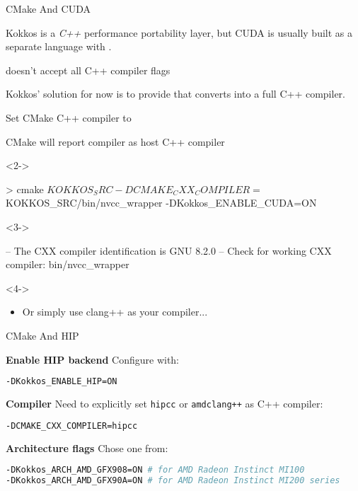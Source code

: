 \begin{frame}[fragile]{CMake And CUDA}
\begin{itemize}
\item Kokkos is a \emph{C++} performance portability layer, but CUDA is usually built as a separate language with .
\item {} doesn't accept all C++ compiler flags
\item Kokkos' solution for now is to provide   that converts  into a full C++ compiler.
 { \item Set CMake C++ compiler to  }
 { \item CMake will report compiler as host C++ compiler }
\end{itemize}

\begin{uncoverenv}<2->
\begin{shell}[linebackground={%
    \btLstHL<2>{2}{orange!30}%
}]
> cmake ${KOKKOS_SRC}
  -DCMAKE_CXX_COMPILER=${KOKKOS_SRC}/bin/nvcc_wrapper
  -DKokkos_ENABLE_CUDA=ON
\end{shell}
\end{uncoverenv}

\begin{uncoverenv}<3->
\begin{shell}[linebackground={
   \btLstHL<3>{1}{green!30}%
   \btLstHL<4>{2}{orange!30}
}]
-- The CXX compiler identification is GNU 8.2.0
-- Check for working CXX compiler: bin/nvcc_wrapper
\end{shell}
\end{uncoverenv}

\begin{uncoverenv}<4->
\begin{itemize}
  \item Or simply use clang++ as your compiler...
\end{itemize}
\end{uncoverenv}

\end{frame}

\begin{frame}[fragile]{CMake And HIP}

\textbf{Enable HIP backend}
Configure with:
\begin{lstlisting}[language=bash]
-DKokkos_ENABLE_HIP=ON
\end{lstlisting}

\textbf{Compiler}
 Need to explicitly set \texttt{hipcc} or \texttt{amdclang++} as C++ compiler:
\begin{lstlisting}[language=bash]
-DCMAKE_CXX_COMPILER=hipcc
\end{lstlisting}

\textbf{Architecture flags}
Chose one from:
\begin{lstlisting}[language=bash]
-DKokkos_ARCH_AMD_GFX908=ON # for AMD Radeon Instinct MI100
-DKokkos_ARCH_AMD_GFX90A=ON # for AMD Radeon Instinct MI200 series
\end{lstlisting}

\end{frame}

